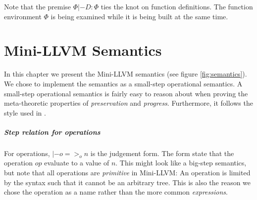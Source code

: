 \documentclass[a4paper, oneside, 10pt, final]{memoir}
\begin{document}
Note that the premise $\Phi |- D : \Phi$ ties the knot on function
definitions. The function environment $\Phi$ is being examined while it
is being built at the same time.



\chapter{Mini-LLVM Semantics}

In this chapter we present the Mini-LLVM semantics (see figure
\ref{fig:semantics}). We chose to implement the semantics as a
small-step operational semantics. A small-step operational semantics
is fairly easy to reason about when proving the meta-theoretic
properties of \emph{preservation} and \emph{progress}. Furthermore, it
follows the style used in \cite{pierce:2002:types}.

\paragraph{Step relation for operations}

\newcommand{\eop}{=>_{o}} For operations, $\boxed{|- o \eop n}$ is the
judgement form. The form state that the operation $op$ evaluate to a
value of $n$. This might look like a big-step semantics, but note that
all operations are \emph{primitive} in Mini-LLVM: An operation is
limited by the syntax such that it cannot be an arbitrary tree. This
is also the reason we chose the operation as a name rather than the
more common \emph{expressions}.
\end{document}
